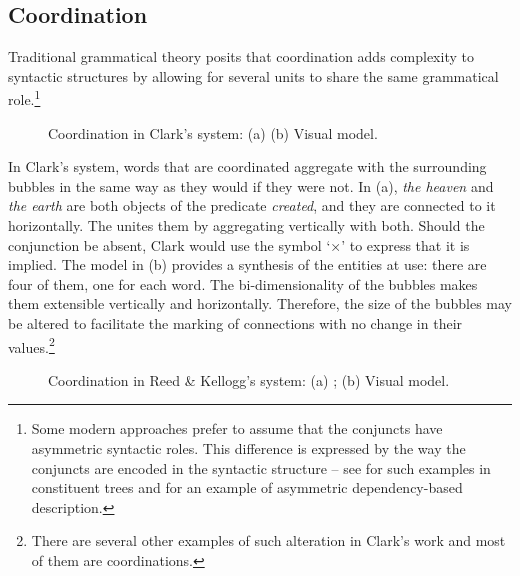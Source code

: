 \documentclass[output=paper]{langsci/langscibook}
\begin{document}
\subsection{Coordination}

Traditional grammatical theory posits that coordination adds complexity to syntactic structures by allowing for several units to share the same grammatical role.\footnote{\textrm{Some modern approaches prefer to assume that the conjuncts have asymmetric syntactic roles. This difference is expressed by the way the conjuncts are encoded in the syntactic structure – see \citet{mouret_grammaire_2007} for such examples in constituent trees and \citet[50--51]{polguere_dependency_2009} for an example of asymmetric dependency-based description.}} 

\begin{figure}
    \caption{Coordination in Clark’s system: (a) \citet[24]{clark_science_1847} (b) Visual model.\label{fig:4:7}}    
\end{figure}
 



In Clark’s system, words that are coordinated aggregate with the surrounding bubbles in the same way as they would if they were not. In (a), \textit{the heaven} and \textit{the earth} are both objects of the predicate \textit{created}, and they are connected to it horizontally. The  unites them by aggregating vertically with both. Should the conjunction be absent, Clark would use the symbol ‘×’ to express that it is implied. The model in (b) provides a synthesis of the entities at use: there are four of them, one for each word. The bi-dimensionality of the bubbles makes them extensible vertically and horizontally. Therefore, the size of the bubbles may be altered to facilitate the marking of connections with no change in their values.\footnote{\textrm{\textsuperscript{} }\textrm{There are several other examples of such alteration in Clark’s work and most of them are coordinations.} } 


\begin{figure}
    \caption{Coordination in Reed \& Kellogg’s system: (a) \citeyear[48]{reed_graded_1879}; (b) Visual model.\label{fig:4:8}}    
\end{figure}
\end{document}
